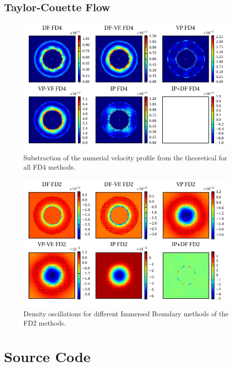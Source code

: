 \section{Taylor-Couette Flow}

\begin{figure}[!h]
  \includegraphics{gfx/immersed_boundary/tcflow/long/vz_profiles_o4.pdf}
  \caption{\label{tcflow:results_vprofiles_o4}
    Substraction of the numerial velocity profile from the theoretical
        for all FD4 methods.}
\end{figure}
\clearpage

\begin{figure}[!h]
  \includegraphics{gfx/immersed_boundary/tcflow/long/rho_o2.pdf}
  \caption{Density oscillations for different Immersed Boundary methods of the FD2 methods.}
    \label{tcflow:results_rho_profiles_o2}
\end{figure}
\clearpage

\chapter{Source Code}

